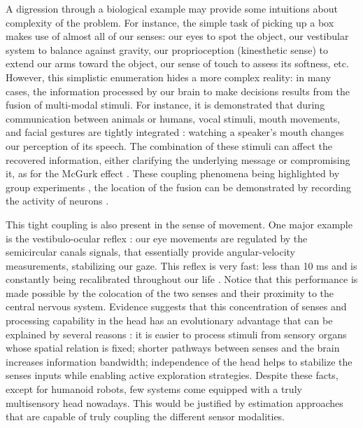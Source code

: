 A digression through a biological example may provide some intuitions about complexity of the problem. For instance, the simple task of picking up a box
makes use of almost all of our senses: our eyes to spot the object, our vestibular system to balance against gravity, our proprioception (kinesthetic sense) 
to extend our arms toward the object, our sense of touch to assess its softness, etc. However, this simplistic enumeration hides a more complex reality:
in many cases, the information processed by our brain to make decisions results from the fusion of multi-modal stimuli. 
For instance, it is demonstrated that during communication between animals or humans, vocal stimuli, mouth movements, and facial gestures are 
tightly integrated \cite{miller2005perceptual, sugihara2006integration}: watching a speaker's mouth changes our perception of its speech. 
The combination of these stimuli can affect the recovered information, either clarifying the underlying message \cite{meredith1983interactions} or 
compromising it, as for the McGurk effect \cite{mcgurk1976hearing}. These coupling phenomena being highlighted by group experiments \cite{mcgurk1976hearing}, 
the location of the fusion can be demonstrated by recording the activity of neurons \cite{rao1997integration}.

This tight coupling is also present in the sense of movement. One major example is the vestibulo-ocular reflex \cite{miles1981plasticity}: our eye movements are regulated 
by the semicircular canals signals, that essentially provide angular-velocity measurements, stabilizing our gaze. This reflex is very fast: less than 10 ms 
\cite{aw1996three} and is constantly being recalibrated throughout our life \cite{miles1981plasticity}. Notice that this performance is made possible 
by the colocation of the two senses and their proximity to the central nervous system. Evidence suggests that this concentration of senses and processing capability
in the head has an evolutionary advantage that can be explained by several reasons \cite{bailly2018should}: it is easier to process stimuli from sensory organs
 whose spatial relation is fixed; shorter pathways between senses and the brain increases information bandwidth; independence of the head helps to stabilize the senses
inputs while enabling active exploration strategies. Despite these facts, except for humanoid robots, few systems come equipped with a truly multisensory head 
nowadays. This would be justified by estimation approaches that are capable of truly coupling the different sensor modalities.

